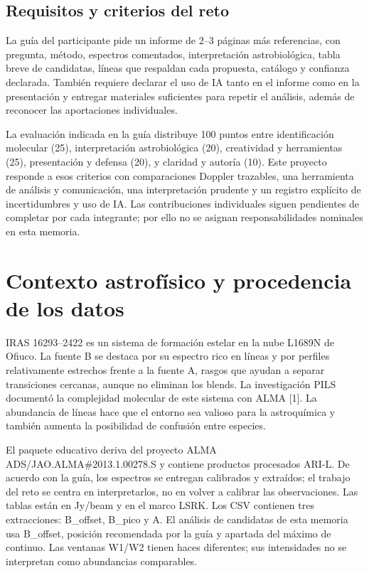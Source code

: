 \documentclass[10pt]{article}
\begin{document}
\subsection{Requisitos y criterios del reto}
La guía del participante pide un informe de 2--3 páginas más referencias, con pregunta, método, espectros comentados, interpretación astrobiológica, tabla breve de candidatas, líneas que respaldan cada propuesta, catálogo y confianza declarada. También requiere declarar el uso de IA tanto en el informe como en la presentación y entregar materiales suficientes para repetir el análisis, además de reconocer las aportaciones individuales.

La evaluación indicada en la guía distribuye 100 puntos entre identificación molecular (25), interpretación astrobiológica (20), creatividad y herramientas (25), presentación y defensa (20), y claridad y autoría (10). Este proyecto responde a esos criterios con comparaciones Doppler trazables, una herramienta de análisis y comunicación, una interpretación prudente y un registro explícito de incertidumbres y uso de IA. Las contribuciones individuales siguen pendientes de completar por cada integrante; por ello no se asignan responsabilidades nominales en esta memoria.

\section{Contexto astrofísico y procedencia de los datos}
IRAS 16293--2422 es un sistema de formación estelar en la nube L1689N de Ofiuco. La fuente B se destaca por su espectro rico en líneas y por perfiles relativamente estrechos frente a la fuente A, rasgos que ayudan a separar transiciones cercanas, aunque no eliminan los blends. La investigación PILS documentó la complejidad molecular de este sistema con ALMA [1]. La abundancia de líneas hace que el entorno sea valioso para la astroquímica y también aumenta la posibilidad de confusión entre especies.

El paquete educativo deriva del proyecto ALMA ADS/JAO.ALMA\#2013.1.00278.S y contiene productos procesados ARI-L. De acuerdo con la guía, los espectros se entregan calibrados y extraídos; el trabajo del reto se centra en interpretarlos, no en volver a calibrar las observaciones. Las tablas están en Jy/beam y en el marco LSRK. Los CSV contienen tres extracciones: B\_offset, B\_pico y A. El análisis de candidatas de esta memoria usa B\_offset, posición recomendada por la guía y apartada del máximo de continuo. Las ventanas W1/W2 tienen haces diferentes; sus intensidades no se interpretan como abundancias comparables.
\end{document}
